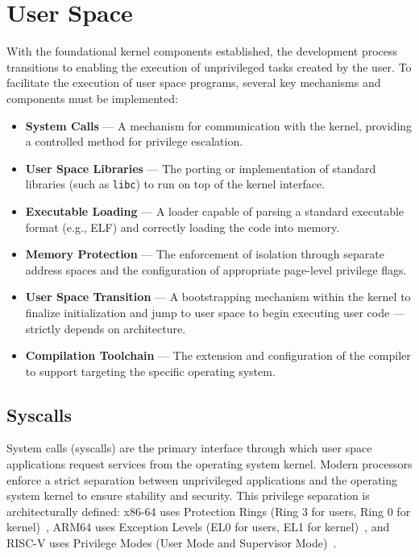 \documentclass[a4paper,10pt,twoside]{report}
\theoremstyle{definition}
\begin{document}
\section{User Space}

With the foundational kernel components established, the development process transitions to enabling the execution of unprivileged tasks created by the user. To facilitate the execution of user space programs, several key mechanisms and components must be implemented:

\begin{itemize} 
    \item \textbf{System Calls} --- A mechanism for communication with the kernel, providing a controlled method for privilege escalation.
    \item \textbf{User Space Libraries} --- The porting or implementation of standard libraries (such as \texttt{libc}) to run on top of the kernel interface.
    \item \textbf{Executable Loading} --- A loader capable of parsing a standard executable format (e.g., ELF) and correctly loading the code into memory.
    \item \textbf{Memory Protection} --- The enforcement of isolation through separate address spaces and the configuration of appropriate page-level privilege flags.
    \item \textbf{User Space Transition} --- A bootstrapping mechanism within the kernel to finalize initialization and jump to user space to begin executing user code --- strictly depends on architecture.
    \item \textbf{Compilation Toolchain} --- The extension and configuration of the compiler to support targeting the specific operating system.
\end{itemize}

\subsection{Syscalls}
\label{subsubsec:syscalls}

System calls (syscalls) are the primary interface through which user space applications request services from the operating system kernel. Modern processors enforce a strict separation between unprivileged applications and the operating system kernel to ensure stability and security. This privilege separation is architecturally defined: x86-64 uses Protection Rings (Ring 3 for users, Ring 0 for kernel)~\cite{IntelManual-Protection-Rings}, ARM64 uses Exception Levels (EL0 for users, EL1 for kernel)~\cite{ARM-Arch-Ref-Exception-Levels}, and RISC-V uses Privilege Modes (User Mode and Supervisor Mode)~\cite{RISCV-Priv-Spec-Privilege-Levels}.
\end{document}
